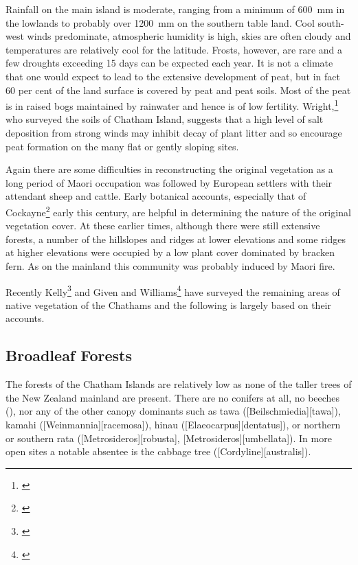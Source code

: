 Rainfall on the main island is moderate, ranging from a minimum of \SI{600}{\milli\metre} in the lowlands to probably over \SI{1200}{\milli\metre} on the southern table land.
Cool south-west winds predominate, atmospheric humidity is high, skies are often cloudy and temperatures are relatively cool for the latitude.
Frosts, however, are rare and a few droughts exceeding 15 days can be expected each year.
It is not a climate that one would expect to lead to the extensive development of peat, but in fact 60 per cent of the land surface is covered by peat and peat soils.
Most of the peat is in raised bogs maintained by rainwater and hence is of low fertility.
Wright,\footnote{\cite{wright1959soils}} who surveyed the soils of Chatham Island, suggests that a high level of salt deposition from strong winds may inhibit decay of plant litter and so encourage peat formation on the many flat or gently sloping sites.

Again there are some difficulties in reconstructing the original vegetation as a long period of Maori occupation was followed by European settlers with their attendant sheep and cattle.
Early botanical accounts, especially that of Cockayne\footnote{\cite{cockayne1902chatham}} early this century, are helpful in determining the nature of the original vegetation cover.
At these earlier times, although there were still extensive forests, a number of the hillslopes and ridges at lower elevations and some ridges at higher elevations were occupied by a low plant cover dominated by bracken fern.
As on the mainland this community was probably induced by Maori fire.

Recently Kelly\footnote{\cite{kelly1983distribution}} and Given and Williams\footnote{\cite{given1984conservation}} have surveyed the remaining areas of native vegetation of the Chathams and the following is largely based on their accounts.

\subsection{Broadleaf Forests}

The forests of the Chatham Islands are relatively low as none of the taller trees of the New Zealand mainland are present.
There are no conifers at all, no beeches (), nor any of the other canopy dominants such as tawa ([Beilschmiedia][tawa]), kamahi ([Weinmannia][racemosa]), hinau ([Elaeocarpus][dentatus]), or northern or southern rata ([Metrosideros][robusta], [Metrosideros][umbellata]).
In more open sites a notable absentee is the cabbage tree ([Cordyline][australis]).

